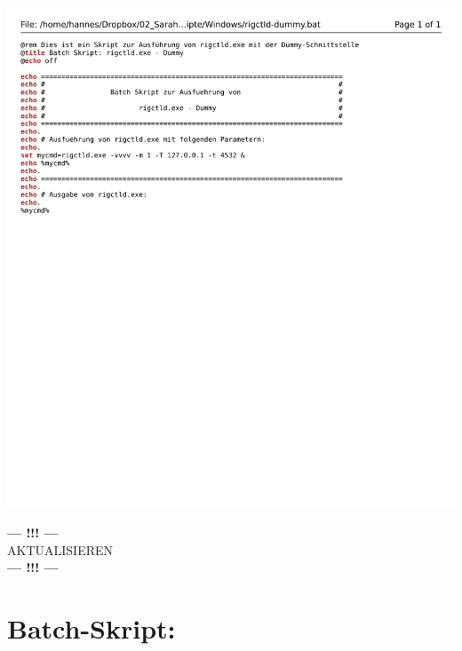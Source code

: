 \begin{center}
	\includegraphics[width=1\textwidth]{./appendicies/rigctld-dummy-windows}
\end{center}

\begin{center}
	\Large{\textbf{--- !!! ---}\\AKTUALISIEREN\\\textbf{--- !!! ---}}
\end{center}


\chapter{Batch-Skript: }
\label{chap:rotctlddummybat}

